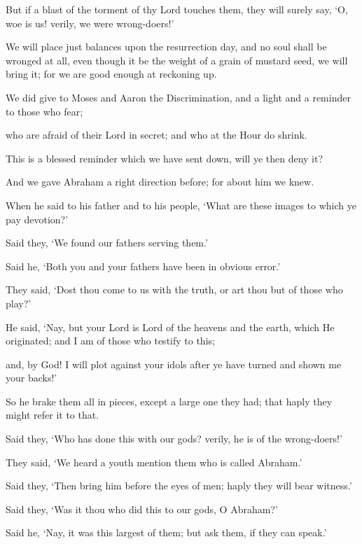 \documentclass[fontsize=14pt, letterpaper, notitlepage, openany, DIV=12]{scrbook} %
\begin{document}
\noindent[21:46]
But if a blast of the torment of thy Lord touches them, they will surely say, `O, woe is us!
verily, we were wrong-doers!'

\noindent[21:47]
We will place just balances upon the resurrection day, and no soul shall be wronged at
all, even though it be the weight of a grain of mustard seed, we will bring it; for we are good
enough at reckoning up.

\noindent[21:48]
We did give to Moses and Aaron the Discrimination, and a light and a reminder to those
who fear;

\noindent[21:49]
who are afraid of their Lord in secret; and who at the Hour do shrink.

\noindent[21:50]
This is a blessed reminder which we have sent down, will ye then deny it?

\noindent[21:51]
And we gave Abraham a right direction before; for about him we knew.

\noindent[21:52]
When he said to his father and to his people, `What are these images to which ye pay
devotion?'

\noindent[21:53]
Said they, `We found our fathers serving them.'

\noindent[21:54]
Said he, `Both you and your fathers have been in obvious error.'

\noindent[21:55]
They said, `Dost thou come to us with the truth, or art thou but of those who play?'

\noindent[21:56]
He said, `Nay, but your Lord is Lord of the heavens and the earth, which He originated;
and I am of those who testify to this;

\noindent[21:57]
and, by God! I will plot against your idols after ye have turned and shown me your
backs!'

\noindent[21:58]
So he brake them all in pieces, except a large one they had; that haply they might refer it
to that.

\noindent[21:59]
Said they, `Who has done this with our gods? verily, he is of the wrong-doers!'

\noindent[21:60]
They said, `We heard a youth mention them who is called Abraham.'

\noindent[21:61]
Said they, `Then bring him before the eyes of men; haply they will bear witness.'

\noindent[21:62]
Said they, `Was it thou who did this to our gods, O Abraham?'

\noindent[21:63]
Said he, `Nay, it was this largest of them; but ask them, if they can speak.'
\end{document}
